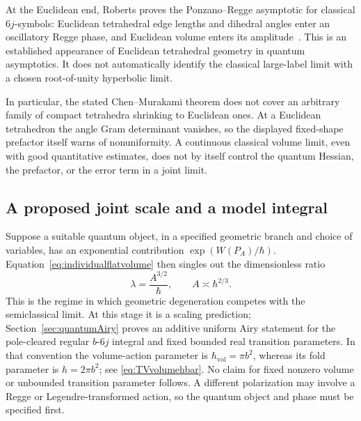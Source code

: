 At the Euclidean end, Roberts proves the Ponzano--Regge asymptotic
for classical $6j$-symbols: Euclidean tetrahedral edge lengths and
dihedral angles enter an oscillatory Regge phase, and Euclidean
volume enters its amplitude~\cite{Roberts}. This is an established
appearance of Euclidean tetrahedral geometry in quantum
asymptotics. It does not automatically identify the classical
large-label limit with a chosen root-of-unity hyperbolic limit.

In particular, the stated Chen--Murakami theorem does not cover
an arbitrary family of compact tetrahedra shrinking to Euclidean
ones. At a Euclidean tetrahedron the angle Gram determinant
vanishes, so the displayed fixed-shape prefactor itself warns of
nonuniformity. A continuous classical volume limit, even with
good quantitative estimates, does not by itself control the
quantum Hessian, the prefactor, or the error term in a joint limit.

\subsection{A proposed joint scale and a model integral}

Suppose a suitable quantum object, in a specified geometric branch
and choice of variables, has an exponential contribution
$\exp(W(P_A)/\hbar)$. Equation~\eqref{eq:individualflatvolume}
then singles out the dimensionless ratio
\begin{equation}
 \lambda=\frac{A^{3/2}}{\hbar},\qquad
 A\asymp\hbar^{2/3}.
 \label{eq:jointscale}
\end{equation}
This is the regime in which geometric degeneration competes
with the semiclassical limit. At this stage it is a scaling prediction;
Section~\ref{sec:quantumAiry} proves an additive uniform Airy
statement for the pole-cleared regular $b$-$6j$ integral and fixed
bounded real transition parameters. In that convention the
volume-action parameter is $\hbar_{\mathrm{vol}}=\pi b^2$,
whereas its fold parameter is $h=2\pi b^2$; see
\eqref{eq:TVvolumehbar}. No claim for fixed nonzero volume or
unbounded transition parameter follows. A different
polarization may involve a Regge or Legendre-transformed action,
so the quantum object and phase must be specified first.

